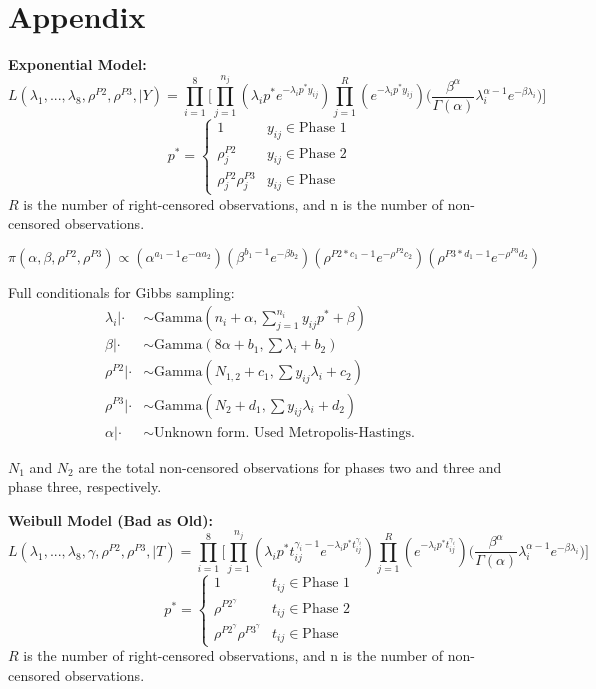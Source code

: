 \documentclass[12pt]{article}
\begin{document}
\section{Appendix}
\textbf{Exponential Model:}
\begin{equation*}
L(\lambda_1, ..., \lambda_8, \rho^{P2}, \rho^{P3}, \vert Y) = \prod_{i = 1}^8
  \Bigg[\prod_{j = 1}^{n_j}(\lambda_i p^*e^{-\lambda_i p^* y_{ij}})\prod_{j =
  1}^R(e^{-\lambda_i p^*
  y_{ij}})\Big(\frac{\beta^\alpha}{\Gamma(\alpha)}\lambda_i^{\alpha -
  1}e^{-\beta\lambda_i}\Big)\Bigg]
\end{equation*}
\[p^* =   \left\{
\begin{array}{ll}
      1 & y_{ij}\in \text{Phase 1} \\
      \rho_{j}^{P2} & y_{ij} \in \text{Phase 2} \\
      \rho_{j}^{P2} \rho_{j}^{P3} & y_{ij} \in \text{Phase }
\end{array}
\right. \]
$R$ is the number of right-censored observations, and n is the number of
non-censored observations.

\begin{equation*}
\pi(\alpha, \beta, \rho^{P2}, \rho^{P3}) \propto (\alpha^{a_1-1}e^{-\alpha
  a_2})(\beta^{b_1 - 1}e^{-\beta b_2})(\rho^{P2*c_1 - 1}e^{-\rho^{P2}
  c_2})(\rho^{P3*d_1 - 1}e^{-\rho^{P3} d_2})
\end{equation*}

Full conditionals for Gibbs sampling:
\begin{align*}
\lambda_i|\cdot &\sim \text{Gamma}(n_i + \alpha, \sum_{j=1}^{n_i}y_{ij}p^* + \beta) \\
\beta|\cdot &\sim \text{Gamma}(8\alpha + b_1, \sum{\lambda_i} + b_2) \\
\rho^{P2}|\cdot &\sim \text{Gamma}(N_{1,2} + c_1, \sum{y_{ij}\lambda_i} + c_2) \\
\rho^{P3}|\cdot &\sim \text{Gamma}(N_{2} + d_1, \sum{y_{ij}\lambda_i} + d_2) \\
\alpha|\cdot &\sim \text{Unknown form.  Used Metropolis-Hastings.}
\end{align*}

$N_1$ and $N_2$ are the total non-censored observations for phases two and three
and phase three, respectively.

\textbf{Weibull Model (Bad as Old):}
\begin{equation*}
  L(\lambda_1, ..., \lambda_8, \gamma, \rho^{P2}, \rho^{P3}, \vert T) = \prod_{i =
    1}^8 \Bigg[\prod_{j = 1}^{n_j}(\lambda_i p^*t_{ij}^{\gamma_i-1} e^{-\lambda_i
    p^* t_{ij}^{\gamma_i}})\prod_{j = 1}^R(e^{-\lambda_i p^*
    t_{ij}^{\gamma_i}})\Big(\frac{\beta^\alpha}{\Gamma(\alpha)}\lambda_i^{\alpha -
    1}e^{-\beta\lambda_i}\Big)\Bigg]
\end{equation*}
\[p^* =   \left\{
\begin{array}{ll}
      1 & t_{ij}\in \text{Phase 1} \\
      \rho^{P2^\gamma} & t_{ij} \in \text{Phase 2} \\
      \rho^{P2^\gamma} \rho^{P3^\gamma} & t_{ij} \in \text{Phase }
\end{array}
\right. \]
$R$ is the number of right-censored observations, and n is the number of
non-censored observations.
\end{document}

